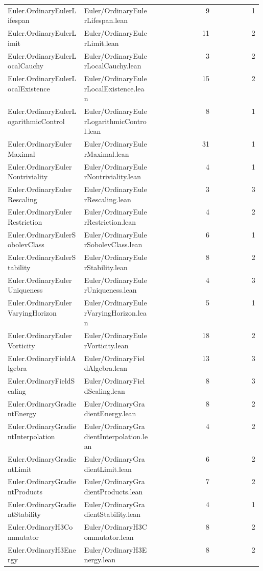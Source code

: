 \begin{longtable}{p{0.30\linewidth}p{0.28\linewidth}rr}
Euler.OrdinaryEulerLifespan & Euler/OrdinaryEulerLifespan.lean & 9 & 1\\
Euler.OrdinaryEulerLimit & Euler/OrdinaryEulerLimit.lean & 11 & 2\\
Euler.OrdinaryEulerLocalCauchy & Euler/OrdinaryEulerLocalCauchy.lean & 3 & 2\\
Euler.OrdinaryEulerLocalExistence & Euler/OrdinaryEulerLocalExistence.lean & 15 & 2\\
Euler.OrdinaryEulerLogarithmicControl & Euler/OrdinaryEulerLogarithmicControl.lean & 8 & 1\\
Euler.OrdinaryEulerMaximal & Euler/OrdinaryEulerMaximal.lean & 31 & 1\\
Euler.OrdinaryEulerNontriviality & Euler/OrdinaryEulerNontriviality.lean & 4 & 1\\
Euler.OrdinaryEulerRescaling & Euler/OrdinaryEulerRescaling.lean & 3 & 3\\
Euler.OrdinaryEulerRestriction & Euler/OrdinaryEulerRestriction.lean & 4 & 2\\
Euler.OrdinaryEulerSobolevClass & Euler/OrdinaryEulerSobolevClass.lean & 6 & 1\\
Euler.OrdinaryEulerStability & Euler/OrdinaryEulerStability.lean & 8 & 2\\
Euler.OrdinaryEulerUniqueness & Euler/OrdinaryEulerUniqueness.lean & 4 & 3\\
Euler.OrdinaryEulerVaryingHorizon & Euler/OrdinaryEulerVaryingHorizon.lean & 5 & 1\\
Euler.OrdinaryEulerVorticity & Euler/OrdinaryEulerVorticity.lean & 18 & 2\\
Euler.OrdinaryFieldAlgebra & Euler/OrdinaryFieldAlgebra.lean & 13 & 3\\
Euler.OrdinaryFieldScaling & Euler/OrdinaryFieldScaling.lean & 8 & 3\\
Euler.OrdinaryGradientEnergy & Euler/OrdinaryGradientEnergy.lean & 8 & 2\\
Euler.OrdinaryGradientInterpolation & Euler/OrdinaryGradientInterpolation.lean & 4 & 2\\
Euler.OrdinaryGradientLimit & Euler/OrdinaryGradientLimit.lean & 6 & 2\\
Euler.OrdinaryGradientProducts & Euler/OrdinaryGradientProducts.lean & 7 & 2\\
Euler.OrdinaryGradientStability & Euler/OrdinaryGradientStability.lean & 4 & 1\\
Euler.OrdinaryH3Commutator & Euler/OrdinaryH3Commutator.lean & 8 & 2\\
Euler.OrdinaryH3Energy & Euler/OrdinaryH3Energy.lean & 8 & 2\\

\end{longtable}
